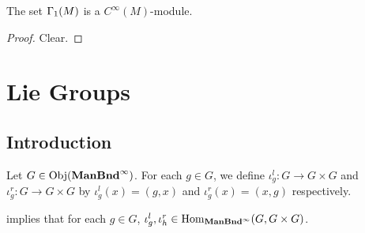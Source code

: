\documentclass{book}
\begin{document}
\begin{ex}
	The set $\Gamma_1(M)$ is a $C^{\infty}(M)$-module.
\end{ex}

\begin{proof}
	Clear.
\end{proof}






























































\newpage
\chapter{Lie Groups}

\section{Introduction}

\begin{defn}
	Let $G \in \operatorname{Obj}(\operatorname*{\text{\textbf{ManBnd}}^{\infty}})$. For each $g \in G$, we define $\iota^l_g:G \rightarrow G \times G$ and $\iota^r_g:G \rightarrow G \times G$ by $\iota^l_g(x) = (g, x)$ and $\iota^r_g(x) = (x, g)$ respectively.
\end{defn}

\begin{note}
	 implies that for each $g \in G$, $\iota^l_g, \iota^r_h \in \operatorname{Hom}_{\operatorname*{\text{\textbf{ManBnd}}^{\infty}}}(G, G \times G)$. 
\end{note}
\end{document}
